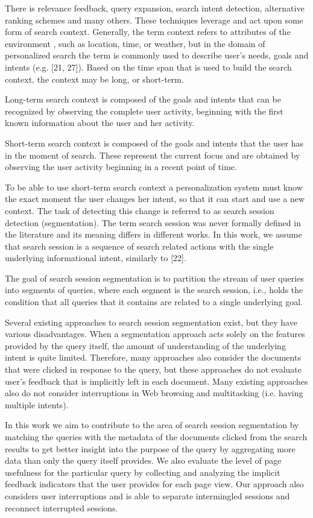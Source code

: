 \documentclass{acm_proc_article-sp} %
\begin{document}
There is relevance feedback, query expansion, search intent
detection, alternative ranking schemes and many others.
These techniques leverage and act upon some form of search
context. Generally, the term context refers to attributes of
the environment \cite{Dourish}, such as location, time, or weather, but
in the domain of personalized search the term is commonly
used to describe user’s needs, goals and intents (e.g. [21, 27]).
Based on the time span that is used to build the search context,
the context may be long, or short-term.

Long-term search context is composed of the goals and intents
that can be recognized by observing the complete user
activity, beginning with the first known information about
the user and her activity.

Short-term search context is composed of the goals and intents
that the user has in the moment of search. These
represent the current focus and are obtained by observing
the user activity beginning in a recent point of time.

To be able to use short-term search context a personalization
system must know the exact moment the user changes
her intent, so that it can start and use a new context. The
task of detecting this change is referred to as search session
detection (segmentation). The term search session was
never formally defined in the literature and its meaning differs
in different works. In this work, we assume that search
session is a sequence of search related actions with the single
underlying informational intent, similarly to [22].

The goal of search session segmentation is to partition the
stream of user queries into segments of queries, where each
segment is the search session, i.e., holds the condition that
all queries that it contains are related to a single underlying
goal.

Several existing approaches to search session segmentation
exist, but they have various disadvantages. When a segmentation
approach acts solely on the features provided by the
query itself, the amount of understanding of the underlying
intent is quite limited. Therefore, many approaches also
consider the documents that were clicked in response to the
query, but these approaches do not evaluate user’s feedback
that is implicitly left in each document. Many existing approaches
also do not consider interruptions in Web browsing
and multitasking (i.e. having multiple intents).

In this work we aim to contribute to the area of search session
segmentation by matching the queries with the metadata
of the documents clicked from the search results to get
better insight into the purpose of the query by aggregating
more data than only the query itself provides. We also
evaluate the level of page usefulness for the particular query
by collecting and analyzing the implicit feedback indicators
that the user provides for each page view. Our approach
also considers user interruptions and is able to separate intermingled
sessions and reconnect interrupted sessions.
\end{document}
